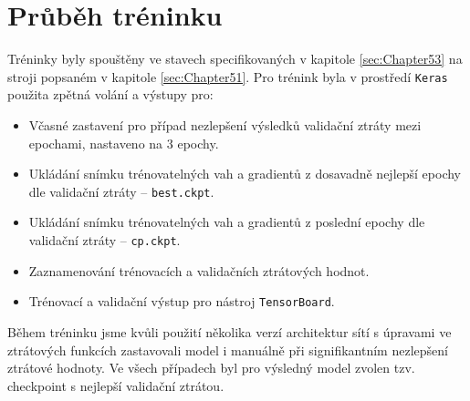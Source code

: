 \section{Průběh tréninku}
\label{sec:Chapter54}
Tréninky byly spouštěny ve stavech specifikovaných v kapitole \ref{sec:Chapter53} na stroji popsaném v kapitole \ref{sec:Chapter51}. Pro trénink byla v prostředí \texttt{Keras} použita zpětná volání a výstupy pro:
\begin{itemize}
    \item Včasné zastavení pro případ nezlepšení výsledků validační ztráty mezi epochami, nastaveno na 3 epochy.
    \item Ukládání snímku trénovatelných vah a gradientů z dosavadně nejlepší epochy dle validační ztráty -- \texttt{best.ckpt}.
    \item Ukládání snímku trénovatelných vah a gradientů z poslední epochy dle validační ztráty -- \texttt{cp.ckpt}.
    \item Zaznamenování trénovacích a validačních ztrátových hodnot.
    \item Trénovací a validační výstup pro nástroj \texttt{TensorBoard}.
\end{itemize}
Během tréninku jsme kvůli použití několika verzí architektur sítí s úpravami ve ztrátových funkcích zastavovali model i manuálně při signifikantním nezlepšení ztrátové hodnoty. Ve všech případech byl pro výsledný model zvolen tzv. checkpoint s nejlepší validační ztrátou.
\endinput
